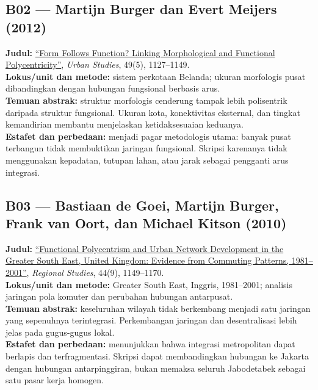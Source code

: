 \documentclass[
  indonesian,
  11pt,
  a4paper,
  oneside,
  openany]{report}
\begin{document}
\subsection{B02 --- Martijn Burger dan Evert Meijers
(2012)}\label{b02-martijn-burger-dan-evert-meijers-2012}

\textbf{Judul:} \href{https://doi.org/10.1177/0042098011407095}{``Form
Follows Function? Linking Morphological and Functional
Polycentricity''}, \emph{Urban Studies}, 49(5), 1127--1149.\\
\textbf{Lokus/unit dan metode:} sistem perkotaan Belanda; ukuran
morfologis pusat dibandingkan dengan hubungan fungsional berbasis
arus.\\
\textbf{Temuan abstrak:} struktur morfologis cenderung tampak lebih
polisentrik daripada struktur fungsional. Ukuran kota, konektivitas
eksternal, dan tingkat kemandirian membantu menjelaskan ketidaksesuaian
keduanya.\\
\textbf{Estafet dan perbedaan:} menjadi pagar metodologis utama: banyak
pusat terbangun tidak membuktikan jaringan fungsional. Skripsi karenanya
tidak menggunakan kepadatan, tutupan lahan, atau jarak sebagai pengganti
arus integrasi.

\subsection{B03 --- Bastiaan de Goei, Martijn Burger, Frank van Oort,
dan Michael Kitson
(2010)}\label{b03-bastiaan-de-goei-martijn-burger-frank-van-oort-dan-michael-kitson-2010}

\textbf{Judul:}
\href{https://doi.org/10.1080/00343400903365102}{``Functional
Polycentrism and Urban Network Development in the Greater South East,
United Kingdom: Evidence from Commuting Patterns, 1981--2001''},
\emph{Regional Studies}, 44(9), 1149--1170.\\
\textbf{Lokus/unit dan metode:} Greater South East, Inggris, 1981--2001;
analisis jaringan pola komuter dan perubahan hubungan antarpusat.\\
\textbf{Temuan abstrak:} keseluruhan wilayah tidak berkembang menjadi
satu jaringan yang sepenuhnya terintegrasi. Perkembangan jaringan dan
desentralisasi lebih jelas pada gugus-gugus lokal.\\
\textbf{Estafet dan perbedaan:} menunjukkan bahwa integrasi metropolitan
dapat berlapis dan terfragmentasi. Skripsi dapat membandingkan hubungan
ke Jakarta dengan hubungan antarpinggiran, bukan memaksa seluruh
Jabodetabek sebagai satu pasar kerja homogen.
\end{document}
